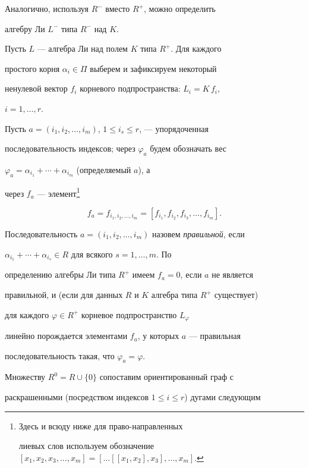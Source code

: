 Аналогично, используя $R^-$ вместо $R^+$, можно определить


алгебру Ли $L^-$ типа $R^-$ над $K$.





Пусть $L$ --- алгебра Ли над полем $K$ типа $R^+$. Для каждого


простого корня $\alpha_i\in\Pi$ выберем и зафиксируем некоторый


ненулевой вектор $f_i$ корневого подпространства: $L_i=K\,f_i$,


$i=1,\dotsc,r$.





Пусть $a=(i_1,i_2,\dotsc,i_m)$, $1\le i_s\le r$, --- упорядоченная


последовательность индексов; через $\varphi_a$ будем обозначать вес


$\varphi_a=\alpha_{i_1}+\dotsb+\alpha_{i_m}$ (определяемый $a$), а


через $f_a$ --- элемент\footnote{Здесь и всюду ниже для право-направленных 


лиевых слов используем обозначение $[x_1,x_2,x_3,\dotsc,x_m]=


[\dotsc[[x_1,x_2],x_3],\dotsc,x_m]$.}


$$


f_a=f_{i_1,i_2,\dotsc,i_m}=[f_{i_1},f_{i_2},f_{i_3},\dotsc,f_{i_m}].


$$


Последовательность $a=(i_1,i_2,\dotsc,i_m)$ назовем {\it правильной}, если


$\alpha_{i_1}+\dotsb+\alpha_{i_s}\in R$ для всякого $s=1,\dotsc,m$. По


определению алгебры Ли типа $R^+$ имеем $f_a=0$, если $a$ не является


правильной, и (если для данных $R$ и $K$ алгебра типа $R^+$ существует)


для каждого $\varphi\in R^+$ корневое подпространство $L_\varphi$


линейно порождается элементами $f_a$, у которых $a$ --- правильная


последовательность такая, что $\varphi_a=\varphi$.





Множеству $R^0=R\cup\{0\}$ сопоставим ориентированный граф с


раскрашенными (посредством индексов $1\le i\le r$) дугами следующим


